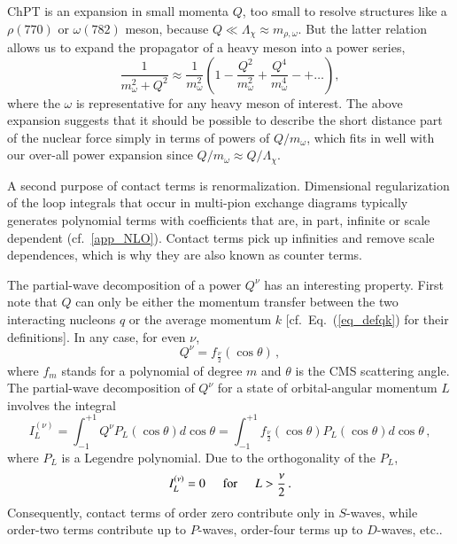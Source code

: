 \documentclass[sort&compress,preprint,3p]{elsarticle}
\begin{document}
ChPT is an expansion in small momenta $Q$, too small
to resolve structures like a $\rho(770)$ or $\omega(782)$
meson, because $Q \ll \Lambda_\chi \approx m_{\rho,\omega}$.
But the latter relation allows us to expand the propagator 
of a heavy meson into a power series,
\begin{equation}
\frac{1}{m^2_\omega + Q^2} 
\approx 
\frac{1}{m^2_\omega} 
\left( 1 
- \frac{Q^2}{m^2_\omega}
+ \frac{Q^4}{m^4_\omega}
-+ \ldots
\right)
,
\end{equation}
where the $\omega$ is representative
for any heavy meson of interest.
The above expansion suggests that it should be 
possible to describe the short distance part of
the nuclear force simply in terms of powers of
$Q/m_\omega$, which fits in well
with our over-all 
power expansion since $Q/m_\omega \approx Q/\Lambda_\chi$.

A second purpose of contact terms is renormalization.
Dimensional regularization
of the loop integrals that occur in multi-pion exchange diagrams
typically generates polynomial terms
with coefficients that are, in part, infinite or scale
dependent (cf.\ \ref{app_NLO}). Contact terms pick up infinities
and remove scale dependences, which is why they are also known as counter terms.


The partial-wave decomposition of a power
$Q^\nu$ has an interesting property.
First note that $Q$ can only be either
the momentum transfer between the two interacting
nucleons $q$ or the average momentum $k$
[cf.\ Eq.~(\ref{eq_defqk}) for their definitions].
In any case, for even $\nu$,
\begin{equation}
Q^\nu = 
f_{\frac{\nu}{2}}(\cos \theta) 
\, ,
\end{equation}
where $f_m$ stands for a polynomial of degree $m$
and $\theta$ is the CMS scattering angle.
The partial-wave decomposition of $Q^\nu$ for a state
of orbital-angular momentum $L$
involves the integral
\begin{equation}
I^{(\nu)}_L  
=\int_{-1}^{+1} Q^\nu P_L(\cos \theta) d\cos \theta 
=\int_{-1}^{+1}
f_{\frac{\nu}{2}}(\cos \theta) 
 P_L(\cos \theta) d\cos \theta 
\,,
\end{equation}
where $P_L$ is a Legendre polynomial.
Due to the orthogonality of the $P_L$, 
\begin{equation}
I^{(\nu)}_L = 0  
\hspace*{.5cm}
\mbox{for}
\hspace*{.5cm}
L > \frac{\nu}{2} \, .
\end{equation}
Consequently, contact terms of order zero contribute only
in $S$-waves, while order-two terms contribute up to 
$P$-waves, order-four terms up to $D$-waves,
etc..
\end{document}
